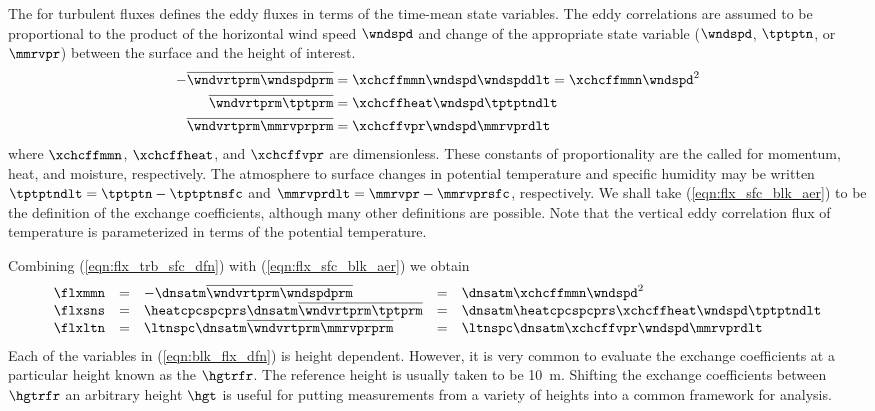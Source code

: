 \documentclass[12pt,twoside]{book}
\begin{document}
The  for turbulent fluxes
defines the eddy fluxes in terms of the time-mean state variables. 
The eddy correlations are assumed to be proportional to the product of
the horizontal wind speed $\wndspd$ and change of the appropriate
state variable ($\wndspd$, $\tptptn$, or $\mmrvpr$) between the
surface and the height of interest. 
\begin{subequations}
\label{eqn:flx_sfc_blk_aer}
\begin{align}
\label{eqn:flx_sfc_blk_aer_mmn}
-\overline{ \wndvrtprm \wndspdprm } & = \xchcffmmn \wndspd \wndspddlt = \xchcffmmn \wndspd^{2} \\ %
\label{eqn:flx_sfc_blk_aer_heat}
\overline{ \wndvrtprm \tptprm } & = \xchcffheat \wndspd \tptptndlt \\ %
\label{eqn:flx_sfc_blk_aer_vpr}
\overline{ \wndvrtprm \mmrvprprm } & = \xchcffvpr \wndspd \mmrvprdlt %
\end{align}
\end{subequations}
where $\xchcffmmn$, $\xchcffheat$, and $\xchcffvpr$ are dimensionless.   
These constants of proportionality are the called  for momentum, heat, and moisture, respectively. 
The atmosphere to surface changes in potential temperature and
specific humidity may be written $\tptptndlt = \tptptn - \tptptnsfc$
and $\mmrvprdlt = \mmrvpr - \mmrvprsfc$, respectively.
We shall take (\ref{eqn:flx_sfc_blk_aer}) to be the definition of the
exchange coefficients, although many other definitions are possible. 
Note that the vertical eddy correlation flux of temperature is
parameterized in terms of the potential temperature.

Combining (\ref{eqn:flx_trb_sfc_dfn}) with (\ref{eqn:flx_sfc_blk_aer}) we
obtain 
\begin{equation}
\begin{array}{ r l l r l }
\flxmmn & = & - \dnsatm \overline{ \wndvrtprm \wndspdprm } 
& = & \dnsatm \xchcffmmn \wndspd^{2} \\ %
\flxsns & = & \heatcpcspcprs \dnsatm \overline{ \wndvrtprm \tptprm} 
& = & \dnsatm \heatcpcspcprs \xchcffheat \wndspd \tptptndlt \\ %
\flxltn & = & \ltnspc \dnsatm \overline{ \wndvrtprm \mmrvprprm} 
& = & \ltnspc \dnsatm \xchcffvpr \wndspd \mmrvprdlt %
\end{array}
\label{eqn:blk_flx_dfn}
\end{equation}
Each of the variables in (\ref{eqn:blk_flx_dfn}) is height dependent. 
However, it is very common to evaluate the exchange coefficients at a
particular height known as the  $\hgtrfr$.
The reference height is usually taken to be 10~m.
Shifting the exchange coefficients between $\hgtrfr$ an arbitrary
height $\hgt$ is useful for putting measurements from a variety of
heights into a common framework for analysis.
\end{document}
